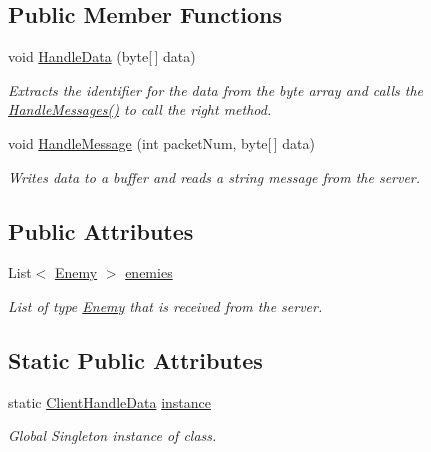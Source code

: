 \subsection*{Public Member Functions}
\begin{DoxyCompactItemize}
\item 
void \mbox{\hyperlink{class_client_handle_data_a42e1bc45eb24e69881b07c1c128252fc}{Handle\+Data}} (byte\mbox{[}$\,$\mbox{]} data)
\begin{DoxyCompactList}\small\item\em Extracts the identifier for the data from the byte array and calls the \mbox{\hyperlink{class_client_handle_data_a2b973713df73e2e1bd53c70557fdcd34}{Handle\+Messages()}} to call the right method. \end{DoxyCompactList}\item 
void \mbox{\hyperlink{class_client_handle_data_af0be33dc4530a4f632b6ef6d7e01f59d}{Handle\+Message}} (int packet\+Num, byte\mbox{[}$\,$\mbox{]} data)
\begin{DoxyCompactList}\small\item\em Writes data to a buffer and reads a string message from the server. \end{DoxyCompactList}\end{DoxyCompactItemize}
\subsection*{Public Attributes}
\begin{DoxyCompactItemize}
\item 
List$<$ \mbox{\hyperlink{class_enemy}{Enemy}} $>$ \mbox{\hyperlink{class_client_handle_data_a9c713b4e3487f59dd8298eb1184249b9}{enemies}}
\begin{DoxyCompactList}\small\item\em List of type \mbox{\hyperlink{class_enemy}{Enemy}} that is received from the server. \end{DoxyCompactList}\end{DoxyCompactItemize}
\subsection*{Static Public Attributes}
\begin{DoxyCompactItemize}
\item 
static \mbox{\hyperlink{class_client_handle_data}{Client\+Handle\+Data}} \mbox{\hyperlink{class_client_handle_data_a473fc5c804badc1de65ef3b0a4b74889}{instance}}
\begin{DoxyCompactList}\small\item\em Global Singleton instance of class. \end{DoxyCompactList}\end{DoxyCompactItemize}
